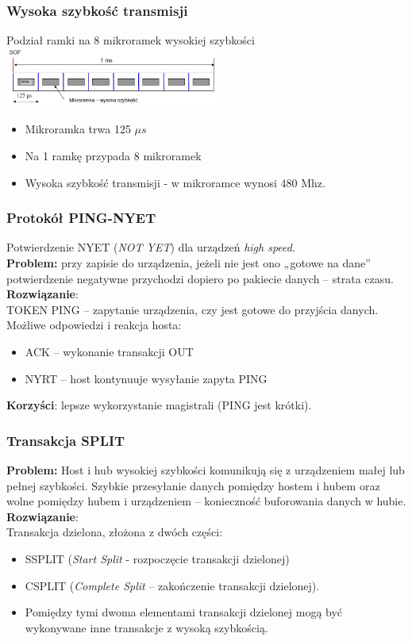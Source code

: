 	\subsubsection{Wysoka szybkość transmisji}
	Podział ramki na 8 mikroramek wysokiej szybkości\\
	\includegraphics[width=7cm]{./wyklady/USB_53_1.jpg}
	\begin{itemize}
		\item Mikroramka trwa 125 $\mu s$
		\item Na 1 ramkę przypada 8 mikroramek
		\item Wysoka szybkość transmisji - w mikroramce wynosi 480 Mhz.
	\end{itemize}
	\subsubsection{Protokół PING-NYET}
	Potwierdzenie NYET (\emph{NOT YET}) dla urządzeń \emph{high speed}.\\
	\textbf{Problem:} przy zapisie do urządzenia, jeżeli nie jest ono „gotowe na dane” potwierdzenie negatywne przychodzi dopiero po pakiecie danych – strata czasu.\\
	\textbf{Rozwiązanie}:\\
	TOKEN PING – zapytanie urządzenia, czy jest gotowe do przyjścia danych.\\
	Możliwe odpowiedzi i reakcja hosta:
	\begin{itemize}
		\item ACK – wykonanie transakcji OUT
		\item NYRT – host kontynuuje wysyłanie zapyta PING
	\end{itemize}
	\textbf{Korzyści}: lepsze wykorzystanie magistrali (PING jest krótki).
	\subsubsection{Transakcja SPLIT}
	\textbf{Problem:} Host i hub wysokiej szybkości komunikują się z urządzeniem małej lub pełnej szybkości. Szybkie przesyłanie danych pomiędzy hostem i hubem oraz wolne pomiędzy hubem i urządzeniem – konieczność buforowania danych w hubie.\\
	\textbf{Rozwiązanie}:\\
	Transakcja dzielona, złożona z dwóch części:
	\begin{itemize}
		\item SSPLIT (\emph{Start Split} - rozpoczęcie transakcji dzielonej)
		\item CSPLIT (\emph{Complete Split} – zakończenie transakcji dzielonej).
		\item Pomiędzy tymi dwoma elementami transakcji dzielonej mogą być wykonywane inne transakcje z wysoką szybkością.
	\end{itemize}
